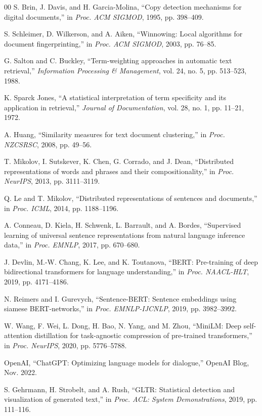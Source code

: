 \documentclass[conference]{IEEEtran}
\begin{document}
\begin{thebibliography}{00}
 S. Brin, J. Davis, and H. Garcia-Molina, ``Copy detection mechanisms for digital documents,'' in \textit{Proc. ACM SIGMOD}, 1995, pp. 398--409.

 S. Schleimer, D. Wilkerson, and A. Aiken, ``Winnowing: Local algorithms for document fingerprinting,'' in \textit{Proc. ACM SIGMOD}, 2003, pp. 76--85.

 G. Salton and C. Buckley, ``Term-weighting approaches in automatic text retrieval,'' \textit{Information Processing \& Management}, vol. 24, no. 5, pp. 513--523, 1988.

 K. Sparck Jones, ``A statistical interpretation of term specificity and its application in retrieval,'' \textit{Journal of Documentation}, vol. 28, no. 1, pp. 11--21, 1972.

 A. Huang, ``Similarity measures for text document clustering,'' in \textit{Proc. NZCSRSC}, 2008, pp. 49--56.

 T. Mikolov, I. Sutskever, K. Chen, G. Corrado, and J. Dean, ``Distributed representations of words and phrases and their compositionality,'' in \textit{Proc. NeurIPS}, 2013, pp. 3111--3119.

 Q. Le and T. Mikolov, ``Distributed representations of sentences and documents,'' in \textit{Proc. ICML}, 2014, pp. 1188--1196.

 A. Conneau, D. Kiela, H. Schwenk, L. Barrault, and A. Bordes, ``Supervised learning of universal sentence representations from natural language inference data,'' in \textit{Proc. EMNLP}, 2017, pp. 670--680.

 J. Devlin, M.-W. Chang, K. Lee, and K. Toutanova, ``BERT: Pre-training of deep bidirectional transformers for language understanding,'' in \textit{Proc. NAACL-HLT}, 2019, pp. 4171--4186.

 N. Reimers and I. Gurevych, ``Sentence-BERT: Sentence embeddings using siamese BERT-networks,'' in \textit{Proc. EMNLP-IJCNLP}, 2019, pp. 3982--3992.

 W. Wang, F. Wei, L. Dong, H. Bao, N. Yang, and M. Zhou, ``MiniLM: Deep self-attention distillation for task-agnostic compression of pre-trained transformers,'' in \textit{Proc. NeurIPS}, 2020, pp. 5776--5788.

 OpenAI, ``ChatGPT: Optimizing language models for dialogue,'' OpenAI Blog, Nov. 2022.

 S. Gehrmann, H. Strobelt, and A. Rush, ``GLTR: Statistical detection and visualization of generated text,'' in \textit{Proc. ACL: System Demonstrations}, 2019, pp. 111--116.


\end{thebibliography}
\end{document}
